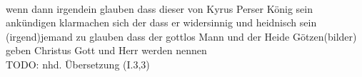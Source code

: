 \begin{exe}
\ex \label{ex:I1051} \gll {}                                             \\
{wenn} {dann} {irgendein} {glauben} {} {dass} {dieser} {von} {Kyrus} {Perser} {König} {sein} {ankündigen} {} {klarmachen} {sich} {der} {} {dass} {er} {widersinnig} {und} {heidnisch} {sein} {(irgend)jemand} {zu} {glauben} {} {dass} {der} {gottlos} {Mann} {und} {der} {Heide} {Götzen(bilder)} {geben} {Christus} {} {Gott} {und} {Herr} {werden} {nennen} {}\\
\glt TODO: nhd. Übersetzung (I.3,3)
\end{exe}
